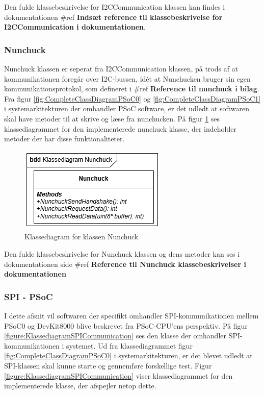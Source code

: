 Den fulde klassebeskrivelse for I2CCommunication klassen kan findes i dokumentationen \#ref \textbf{Indsæt reference til klassebeskrivelse for I2CCommunication i dokumentationen}.

\subsubsection{Nunchuck}
Nunchuck klassen er seperat fra I2CCommunication klassen, på trods af at kommunikationen foregår over I2C-bussen, idét at Nunchucken bruger sin egen kommunikationsprotokol, som defineret i \#ref \textbf{Reference til nunchuck i bilag}. Fra figur \ref{fig:CompleteClassDiagramPSoC0} og \ref{fig:CompleteClassDiagramPSoC1} i systemarkitekturen der omhandler PSoC software, er det udledt at softwaren skal have metoder til at skrive og læse fra nunchucken. På figur \ref{figure:NunchuckKlassediagram} ses klassediagrammet for den implementerede nunchuck klasse, der indeholder metoder der har disse funktionaliteter.


\begin{figure}[H]
	\centering
	\includegraphics[]{DesignOgImplementering/images/nunchuck}
	\caption{Klassediagram for klassen Nunchuck}
	\label{figure:NunchuckKlassediagram}
\end{figure}

Den fulde klassebeskrivelse for Nunchuck klassen og dens metoder kan ses i dokumentationen side \#ref \textbf{Reference til Nunchuck klassebeskrivelser i dokumentationen} 

\subsubsection{SPI - PSoC}
I dette afsnit vil softwaren der specifikt omhandler SPI-kommunikationen mellem PSoC0 og DevKit8000 blive beskrevet fra PSoC-CPU'ens perspektiv. På figur \ref{figure:KlassediagramSPICommunication} ses den klasse der omhandler SPI-kommunikationen i systemet. Ud fra klassediagrammet figur \ref{fig:CompleteClassDiagramPSoC0} i systemarkitekturen, er det blevet udledt at SPI-klassen skal kunne starte og gennemføre forskellige test. Figur \ref{figure:KlassediagramSPICommunication} viser klassediagrammet for den implementerede klasse, der afspejler netop dette.


